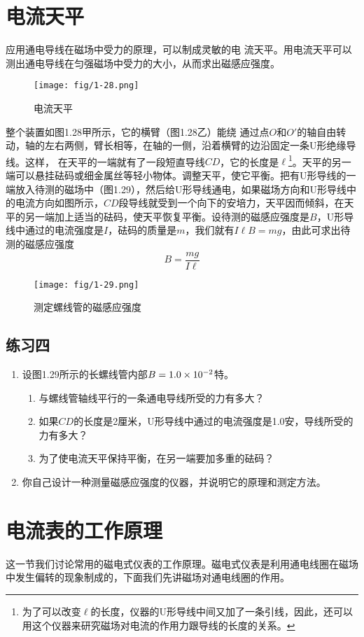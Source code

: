 \section{电流天平}
应用通电导线在磁场中受力的原理，可以制成灵敏的电
流天平。用电流天平可以测出通电导线在匀强磁场中受力的大小，从而求出磁感应强度。
    \begin{figure}[htp]\centering
	\texttt{[image: fig/1-28.png]}
	\caption{电流天平}
\end{figure}

整个装置如图1.28甲所示，它的横臂（图1.28乙）能绕
通过点$O$和$O'$的轴自由转动，轴的左右两侧，臂长相等，在轴的一侧，沿着横臂的边沿固定一条U形绝缘导线。这样，
在天平的一端就有了一段短直导线$CD$，它的长度是$\ell$\footnote{为了可以改变$\ell$的长度，仪器的U形导线中间又加了一条引线，因此，还可以用这个仪器来研究磁场对电流的作用力跟导线的长度的关系。}。天平的另一端可以悬挂砝码或细金属丝等轻小物体。调整天平，使它平衡。把有U形导线的一端放入待测的磁场中（图1.29），然后给U形导线通电，如果磁场方向和U形导线中的电流方向如图所示，$CD$段导线就受到一个向下的安培力，天平因而倾斜，在天平的另一端加上适当的砝码，使天平恢复平衡。设待测的磁感应强度是$B$，U形导线中通过的电流强度是$I$，砝码的质量是$m$，我们就有$I\ell B=mg$，由此可求出待测的磁感应强度
\[B=\frac{mg}{I\ell}\]
    \begin{figure}[htp]\centering
	\texttt{[image: fig/1-29.png]}
	\caption{测定螺线管的磁感应强度}
\end{figure}

\subsection*{练习四}
\begin{enumerate}
    \item 设图1.29所示的长螺线管内部$B=1.0\times10^{-2}$特。
    \begin{enumerate}
        \item 与螺线管轴线平行的一条通电导线所受的力有多大？
        \item 如果$CD$的长度是2厘米，U形导线中通过的电流强度是1.0安，导线所受的力有多大？
        \item 为了使电流天平保持平衡，在另一端要加多重的砝码？
    \end{enumerate}
    \item 你自己设计一种测量磁感应强度的仪器，并说明它的原理和测定方法。
\end{enumerate}


\section{电流表的工作原理}
这一节我们讨论常用的磁电式仪表的工作原理。磁电式仪表是利用通电线圈在磁场中发生偏转的现象制成的，下面我们先讲磁场对通电线圈的作用。

